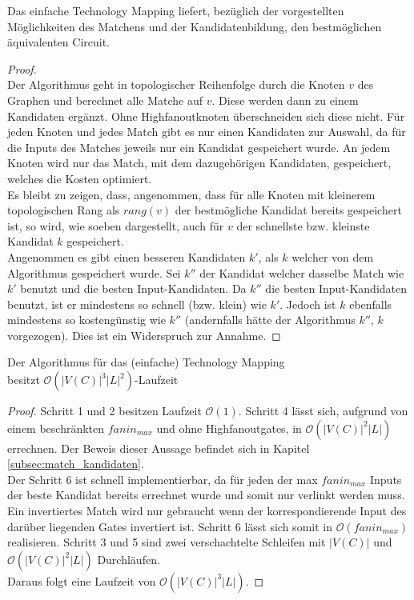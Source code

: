 \documentclass[11pt, a4paper, german]{article}
\newcommand{\TM}{Technology  Mapping }
\begin{document}
\begin{cor}
	Das einfache \TM  liefert, bezüglich der vorgestellten Möglichkeiten des Matchens und der Kandidatenbildung, den bestmöglichen äquivalenten Circuit.
\end{cor}
\begin{proof} \ \\
	Der Algorithmus geht in topologischer Reihenfolge durch die Knoten $v$ des Graphen und berechnet alle Matche auf $v$. Diese werden dann zu einem Kandidaten ergänzt. 
 Ohne Highfanoutknoten überschneiden sich diese nicht. Für jeden Knoten und jedes Match gibt es nur einen Kandidaten zur Auswahl, da für die Inputs des Matches jeweils nur ein Kandidat gespeichert wurde. An jedem Knoten wird nur das Match, mit dem dazugehörigen Kandidaten, gespeichert, welches die Kosten optimiert. \\
 Es bleibt zu zeigen, dass, angenommen, dass für alle Knoten mit kleinerem topologischen Rang als $rang(v)$ der bestmögliche Kandidat bereits gespeichert ist, so wird, wie soeben dargestellt, auch für $v$ der schnellste bzw. kleinste Kandidat $k$ gespeichert. \\
 Angenommen es gibt einen besseren Kandidaten $k'$, als $k$ welcher von dem Algorithmus gespeichert wurde. Sei $k''$ der Kandidat welcher dasselbe Match wie $k'$ benutzt und die besten Input-Kandidaten. Da $k''$ die besten Input-Kandidaten benutzt, ist er mindestens so schnell (bzw. klein) wie $k'$. Jedoch ist $k$ ebenfalls mindestens so kostengünstig wie $k''$ (andernfalls hätte der Algorithmus $k''$, $k$ vorgezogen). Dies ist ein Widerspruch zur Annahme. 
\end{proof}
 
\begin{cor}{Der Algorithmus für das (einfache) \TM  \\ besitzt $\mathcal{O}(  |V(C)|^3|L|^2)$-Laufzeit}
\end{cor}
\begin{proof}
Schritt 1 und 2 besitzen Laufzeit $\mathcal{O}(1)$. Schritt 4 lässt sich, aufgrund von einem beschränkten $fanin_{max}$ und ohne Highfanoutgates, in $\mathcal{O}(|V(C)|^2|L|)$ errechnen. Der Beweis dieser Aussage befindet sich in Kapitel \ref{subsec:match_kandidaten}.\\
Der Schritt 6 ist schnell implementierbar, da für jeden der max $fanin_{max}$ Inputs der beste Kandidat bereits errechnet wurde und somit nur verlinkt werden muss. Ein invertiertes Match wird nur gebraucht wenn der korrespondierende Input des darüber liegenden Gates invertiert ist. Schritt 6 lässt sich somit in  $\mathcal{O}(fanin_{max})$ realisieren. Schritt 3 und 5 sind zwei verschachtelte Schleifen mit  $|V(C)|$ und $\mathcal{O}(|V(C)|^2|L|)$ Durchläufen. \\
Daraus folgt eine Laufzeit von $\mathcal{O}(  |V(C)|^3|L|)$.
\end{proof}
\end{document}
